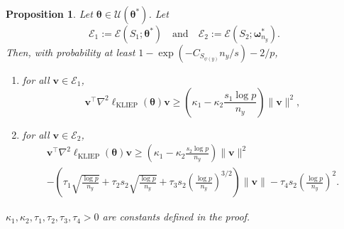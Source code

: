 \documentclass[11pt]{article}
\numberwithin{equation}{section}
\numberwithin{theorem}{section}
\def\fatv{\boldsymbol{v}}
\def\fattheta{\boldsymbol{\theta}}
\def\fatomega{\boldsymbol{\omega}}
\newtheorem{prop}[lem]{Proposition}
\theoremstyle{definition}
\theoremstyle{remark}
\begin{document}
\begin{prop}
Let $\fattheta \in \mathcal{U}(\fattheta^*)$.
Let
\begin{equation}
\mathcal{E}_1 := \mathcal{E}(S_1;\fattheta^*)
\quad \text{and} \quad
\mathcal{E}_2 := \mathcal{E}(S_2;\fatomega_{n_y}^*).
\end{equation}
Then, with probability at least $1 - \exp(-C_{S_{\psi(y)}} n_y / s) - 2 / p$,
\begin{enumerate}
\item for all $\fatv \in \mathcal{E}_1$,
\begin{equation}
\fatv^\top \nabla^2 \ell_\text{KLIEP}(\fattheta) \fatv \geq \left( \kappa_1 - \kappa_2 \frac{s_1 \log p}{n_y} \right) \|\fatv\|^2,
\end{equation}
\item for all $\fatv \in \mathcal{E}_2$,
\begin{multline}
\fatv^\top \nabla^2 \ell_\text{KLIEP}(\fattheta) \fatv
\geq \left( \kappa_1 - \kappa_2 \frac{s_2 \log p}{n_y} \right) \|\fatv\|^2 \\
- \left( \tau_1 \sqrt{\frac{\log p}{n_y}} + \tau_2 s_2 \sqrt{\frac{\log p}{n_y}} + \tau_3 s_2 \left( \frac{\log p}{n_y} \right)^{3/2} \right) \|\fatv\| - \tau_4 s_2 \left( \frac{\log p}{n_y} \right)^2.
\end{multline}
\end{enumerate}
$\kappa_1, \kappa_2, \tau_1, \tau_2, \tau_3, \tau_4 > 0$ are constants defined in the proof.
\end{prop}
\end{document}
